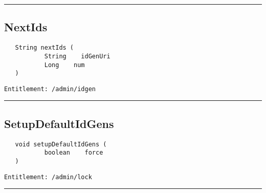 \rule{12cm}{2pt}
\subsection{NextIds}
\label{Api:NextIds}
\begin{verbatim}
   String nextIds (
           String    idGenUri
           Long    num
   )
\end{verbatim}
\begin{Verbatim}[fontsize=\small, formatcom=\color{Maroon}]
  Entitlement: /admin/idgen
\end{Verbatim}



\rule{12cm}{2pt}
\subsection{SetupDefaultIdGens}
\label{Api:SetupDefaultIdGens}
\begin{verbatim}
   void setupDefaultIdGens (
           boolean    force
   )
\end{verbatim}
\begin{Verbatim}[fontsize=\small, formatcom=\color{Maroon}]
  Entitlement: /admin/lock
\end{Verbatim}



\rule{12cm}{2pt}
